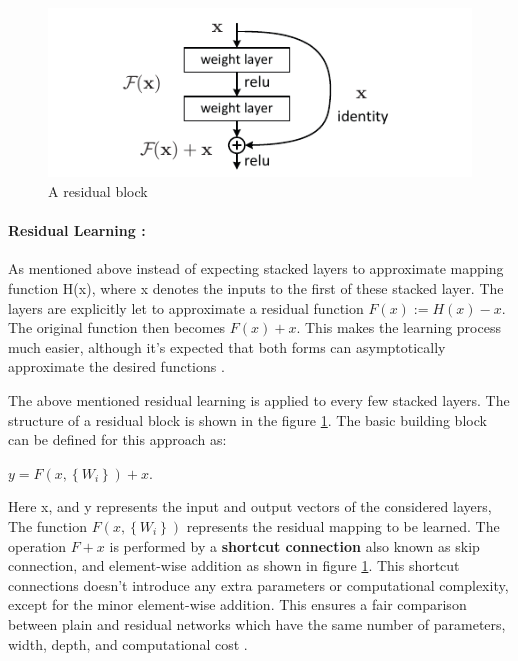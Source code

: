 \begin{figure}[!ht]
    \centering
    \includegraphics[width=1.2\linewidth]{Rohit_Master_Thesis//Images/residual_block.pdf}
    \caption{A residual block \cite{he2016deep}}
    \label{fig:residual block}
\end{figure}

\paragraph*{Residual Learning :}

As mentioned above instead of expecting stacked layers to approximate mapping function H(x), where x denotes the inputs to the first of these stacked layer. The layers are explicitly let to approximate a residual function $F(x) := H(x) - x$. The original function then becomes $F(x) + x$. This makes the learning process much easier, although it's expected that both forms can asymptotically approximate the desired functions \cite{he2016deep}.

The above mentioned residual learning is applied to every few stacked layers. The structure of a residual block is shown in the figure \ref{fig:residual block}. The basic building block can be defined for this approach as:

$ y = F(x, \left\{ W_{i}\right\}) + x$.

Here x, and y represents the input and output vectors of the considered layers, The function $F(x, \left\{ W_{i}\right\})$  represents the residual mapping to be learned. The operation $F + x$ is performed by a \textbf{shortcut connection} also known as skip connection, and element-wise addition as shown in figure \ref{fig:residual block}. This shortcut connections doesn't introduce any extra parameters or computational complexity, except for the minor element-wise addition. This ensures a fair comparison between plain and residual networks  which have the same number of parameters, width, depth, and computational cost \cite{he2016deep}.

